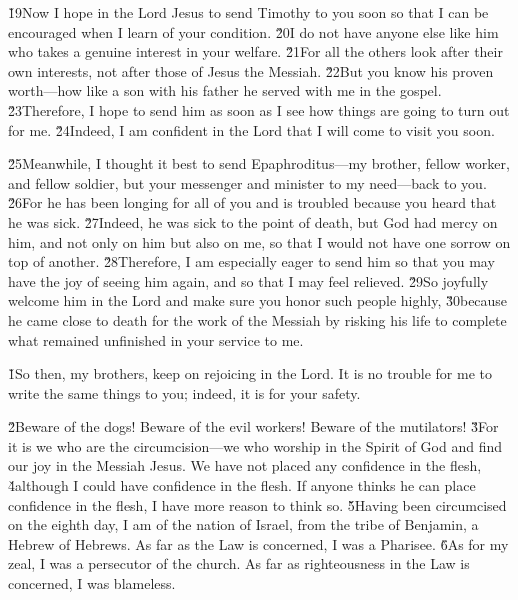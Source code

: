 \v{19}Now I hope in the Lord Jesus to send Timothy to you soon so that I can be encouraged when I learn of your condition. \v{20}I do not have anyone else like him who takes a genuine interest in your welfare. \v{21}For all the others look after their own interests, not after those of Jesus the Messiah. \v{22}But you know his proven worth---how like a son with his father he served with me in the gospel. \v{23}Therefore, I hope to send him as soon as I see how things are going to turn out for me. \v{24}Indeed, I am confident in the Lord that I will come to visit you soon.

\v{25}Meanwhile, I thought it best to send Epaphroditus---my brother, fellow worker, and fellow soldier, but your messenger and minister to my need---back to you. \v{26}For he has been longing for all of you and is troubled because you heard that he was sick. \v{27}Indeed, he was sick to the point of death, but God had mercy on him, and not only on him but also on me, so that I would not have one sorrow on top of another. \v{28}Therefore, I am especially eager to send him so that you may have the joy of seeing him again, and so that I may feel relieved. \v{29}So joyfully welcome him in the Lord and make sure you honor such people highly, \v{30}because he came close to death for the work of the Messiah by risking his life to complete what remained unfinished in your service to me.

\v{1}So then, my brothers, keep on rejoicing in the Lord. It is no trouble for me to write the same things to you; indeed, it is for your safety.

\v{2}Beware of the dogs! Beware of the evil workers! Beware of the mutilators! \v{3}For it is we who are the circumcision---we who worship in the Spirit of God and find our joy in the Messiah Jesus. We have not placed any confidence in the flesh, \v{4}although I could have confidence in the flesh. If anyone thinks he can place confidence in the flesh, I have more reason to think so. \v{5}Having been circumcised on the eighth day, I am of the nation of Israel, from the tribe of Benjamin, a Hebrew of Hebrews. As far as the Law is concerned, I was a Pharisee. \v{6}As for my zeal, I was a persecutor of the church. As far as righteousness in the Law is concerned, I was blameless.


